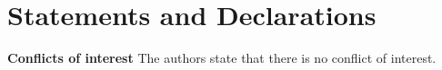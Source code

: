 \documentclass[12pt]{article}
\begin{document}
\section*{Statements and Declarations}

\textbf{Conflicts of interest} The authors state that there is no conflict of interest.













  
\end{document}
